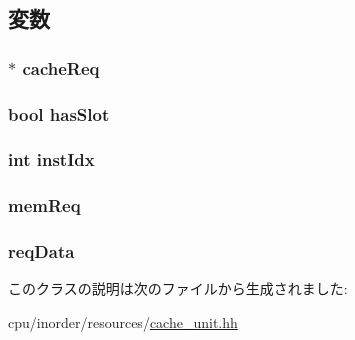 \subsection{変数}
\hypertarget{classCacheReqPacket_ac55dd41eb7bb1d4c2abf3ef65d8c9a02}{
\subsubsection[{cacheReq}]{$\ast$ {\bf cacheReq}}}
\label{classCacheReqPacket_ac55dd41eb7bb1d4c2abf3ef65d8c9a02}
\hypertarget{classCacheReqPacket_a28e9cd0c873d2bd6b2ac86283f614469}{
\subsubsection[{hasSlot}]{\setlength{\rightskip}{0pt plus 5cm}bool {\bf hasSlot}}}
\label{classCacheReqPacket_a28e9cd0c873d2bd6b2ac86283f614469}
\hypertarget{classCacheReqPacket_a65152017e4eb674a60e1b6c374b2df6f}{
\subsubsection[{instIdx}]{\setlength{\rightskip}{0pt plus 5cm}int {\bf instIdx}}}
\label{classCacheReqPacket_a65152017e4eb674a60e1b6c374b2df6f}
\hypertarget{classCacheReqPacket_a5520eb2f7c2cf4b0e109d6ffd6d2d053}{
\subsubsection[{memReq}]{ {\bf memReq}}}
\label{classCacheReqPacket_a5520eb2f7c2cf4b0e109d6ffd6d2d053}
\hypertarget{classCacheReqPacket_a3c85036decf244a8280a1ca878e81b34}{
\subsubsection[{reqData}]{ {\bf reqData}}}
\label{classCacheReqPacket_a3c85036decf244a8280a1ca878e81b34}


このクラスの説明は次のファイルから生成されました:\begin{DoxyCompactItemize}
\item 
cpu/inorder/resources/\hyperlink{cache__unit_8hh}{cache\_\-unit.hh}\end{DoxyCompactItemize}
